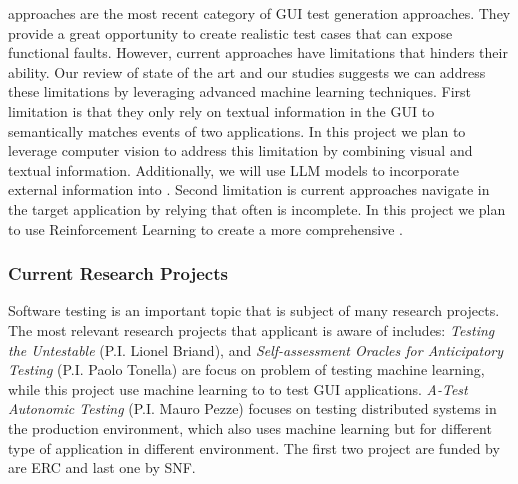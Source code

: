 
\bigskip
\testreuse approaches are the most recent category of GUI test generation approaches. 
They provide a great opportunity to create realistic test cases that can expose functional faults.
However, current approaches have limitations that hinders their ability. 
Our review of state of the art and our studies suggests we can address these limitations by leveraging advanced machine learning techniques.
First limitation is that they only rely on textual information in the GUI to semantically matches events of two applications. 
In this project we plan to leverage computer vision to address this limitation by combining visual and textual information.
Additionally, we will use LLM models to incorporate external information into \testreuse. 
Second limitation is current approaches navigate in the target application by relying \tam that often is incomplete. 
In this project we plan to use Reinforcement Learning to create a more comprehensive \tam.



\subsubsection{Current Research Projects}
Software testing is an important topic that is subject of many research projects.
The most relevant research projects that applicant is aware of includes:
\textit{Testing the Untestable} (P.I. Lionel Briand), and
\textit{Self-assessment Oracles for Anticipatory Testing} (P.I. Paolo Tonella) are focus on problem of testing machine learning, while this project use machine learning to to test GUI applications.
\textit{A-Test Autonomic Testing} (P.I. Mauro Pezze) focuses on testing distributed systems in the production environment, which also uses machine learning but for different type of application in different environment. 
The first two project are funded by are ERC and last one by SNF.



